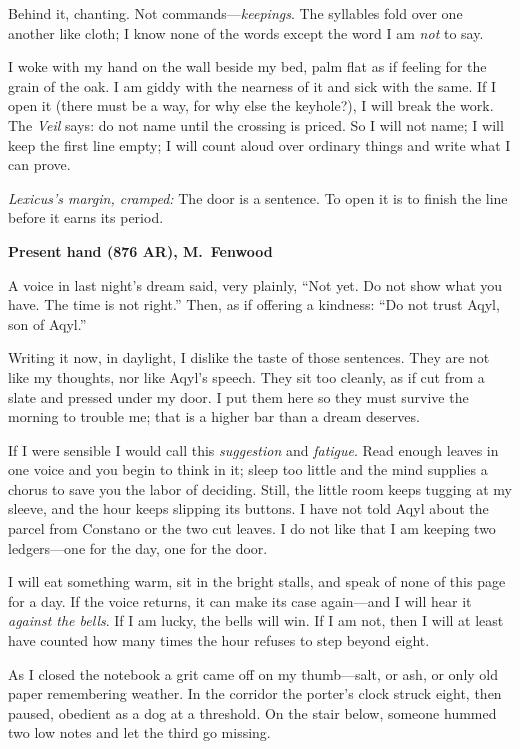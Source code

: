 \documentclass[11pt]{article}
\numberwithin{equation}{section} %
\theoremstyle{plain} %
\theoremstyle{definition} %
\theoremstyle{remark} %
\begin{document}
Behind it, chanting. Not commands—\emph{keepings}. The syllables fold over one another like cloth; I know none of the words except the word I am \emph{not} to say.

I woke with my hand on the wall beside my bed, palm flat as if feeling for the grain of the oak. I am giddy with the nearness of it and sick with the same. If I open it (there must be a way, for why else the keyhole?), I will break the work. The \textit{Veil} says: do not name until the crossing is priced. So I will not name; I will keep the first line empty; I will count aloud over ordinary things and write what I can prove.

\medskip
\noindent\textit{Lexicus’s margin, cramped:} The door is a sentence. To open it is to finish the line before it earns its period.

\medskip
\noindent\textbf{Present hand (876 AR), M.\ Fenwood}

A voice in last night’s dream said, very plainly, “Not yet. Do not show what you have. The time is not right.” Then, as if offering a kindness: “Do not trust Aqyl, son of Aqyl.”

Writing it now, in daylight, I dislike the taste of those sentences. They are not like my thoughts, nor like Aqyl’s speech. They sit too cleanly, as if cut from a slate and pressed under my door. I put them here so they must survive the morning to trouble me; that is a higher bar than a dream deserves.

If I were sensible I would call this \emph{suggestion} and \emph{fatigue}. Read enough leaves in one voice and you begin to think in it; sleep too little and the mind supplies a chorus to save you the labor of deciding. Still, the little room keeps tugging at my sleeve, and the hour keeps slipping its buttons. I have not told Aqyl about the parcel from Constano or the two cut leaves. I do not like that I am keeping two ledgers—one for the day, one for the door.

I will eat something warm, sit in the bright stalls, and speak of none of this page for a day. If the voice returns, it can make its case again—and I will hear it \emph{against the bells}. If I am lucky, the bells will win. If I am not, then I will at least have counted how many times the hour refuses to step beyond eight.

As I closed the notebook a grit came off on my thumb—salt, or ash, or only old paper remembering weather. In the corridor the porter’s clock struck eight, then paused, obedient as a dog at a threshold. On the stair below, someone hummed two low notes and let the third go missing.
\end{document}

